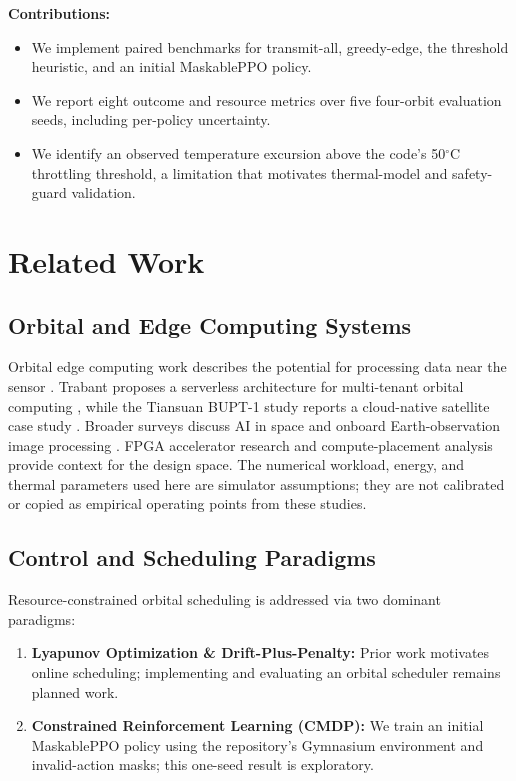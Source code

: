 \documentclass[conference]{IEEEtran}
\begin{document}
\textbf{Contributions:}
\begin{itemize}
    \item We implement paired benchmarks for transmit-all, greedy-edge, the threshold heuristic, and an initial MaskablePPO policy.
    \item We report eight outcome and resource metrics over five four-orbit evaluation seeds, including per-policy uncertainty.
    \item We identify an observed temperature excursion above the code's 50$^\circ$C throttling threshold, a limitation that motivates thermal-model and safety-guard validation.
\end{itemize}

\section{Related Work}
\subsection{Orbital and Edge Computing Systems}
Orbital edge computing work describes the potential for processing data near the sensor \cite{denby2020orbital}. Trabant proposes a serverless architecture for multi-tenant orbital computing \cite{pfandzelter2024trabant}, while the Tiansuan BUPT-1 study reports a cloud-native satellite case study \cite{zhang2023satellite}. Broader surveys discuss AI in space \cite{chen2025spaceai} and onboard Earth-observation image processing \cite{duggan2025advancing}. FPGA accelerator research \cite{lentaris2024fpga} and compute-placement analysis \cite{denby2025when} provide context for the design space. The numerical workload, energy, and thermal parameters used here are simulator assumptions; they are not calibrated or copied as empirical operating points from these studies.

\subsection{Control and Scheduling Paradigms}
Resource-constrained orbital scheduling is addressed via two dominant paradigms:
\begin{enumerate}
    \item \textbf{Lyapunov Optimization \& Drift-Plus-Penalty:} Prior work \cite{neely2010stochastic} motivates online scheduling; implementing and evaluating an orbital scheduler remains planned work.
    \item \textbf{Constrained Reinforcement Learning (CMDP):} We train an initial MaskablePPO policy using the repository's Gymnasium environment and invalid-action masks; this one-seed result is exploratory.
\end{enumerate}
\end{document}
